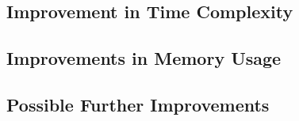 \documentclass[journal, a4paper]{IEEEtran}
\begin{document}
\subsection{Improvement in Time Complexity}

\subsection{Improvements in Memory Usage}

\subsection{Possible Further Improvements}


\end{document}
